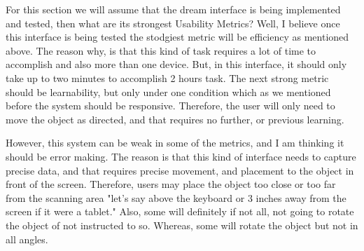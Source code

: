\documentclass[12pt, oneside]{amsart}   	%
\begin{document}
For this section we will assume that the dream interface is being implemented and tested, then what are its strongest Usability Metrics?  Well, I believe once this interface is being tested the stodgiest metric will be efficiency as mentioned above.  The reason why, is that this kind of task requires a lot of time to accomplish and also more than one device. But, in this interface, it should only take up to two minutes to accomplish 2 hours task.  The next strong metric should be learnability, but only under one condition which as we mentioned before the system should be responsive.  Therefore, the user will only need to move the object as directed, and that requires no further, or previous learning. 
%

However, this system can be weak in some of the metrics, and I am thinking it should be error making.  The reason is that this kind of interface needs to capture precise data, and that requires precise movement, and placement to the object in front of the screen.  Therefore, users may place the object too close or too far from the scanning area "let's say above the keyboard or 3 inches away from the screen if it were a tablet."  Also, some will definitely if not all, not going to rotate the object of not instructed to so. Whereas, some will rotate the object but not in all angles.  
\end{document}
